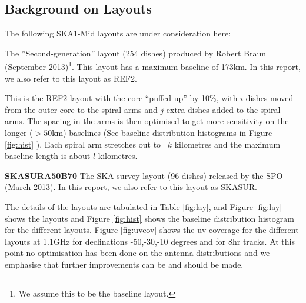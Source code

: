 \documentclass[sfheadings,a4paper,times,9pt,floats,floatfix]{article}
\begin{document}
\subsection{Background on Layouts}\label{sec:layouts}
The following SKA1-Mid layouts are under consideration here:
\begin{description}
\item[{\bf REF2A100B173}] The ”Second-generation” layout (254 dishes) produced by Robert Braun (September 2013)\footnote{We assume
this to be the baseline layout.}. This layout has a maximum baseline of 173km. In this report, we also refer to this layout as
REF2.
\item[{\bf W$i$-$j$A$k$B$l$}] This is the REF2 layout with the core ``puffed up'' by 10\%,  with $ i$ dishes moved  from the
outer core to the spiral arms and $j$ extra dishes added to the spiral arms. The spacing in the arms is then optimised  to get
more sensitivity on the longer ($>50$km) baselines (See baseline distribution histograms in Figure \ref{fig:hist} ). Each spiral
arm stretches out to ~$k$ kilometres and the maximum baseline length is about $l$ kilometres.
\item {\bf SKASURA50B70} The SKA survey layout (96 dishes) released by the SPO (March 2013). In this report, we also refer to
this layout as SKASUR.
\end{description}
The details of the layouts are tabulated in Table \ref{fig:lay}, and Figure \ref{fig:lay} shows the layouts and Figure
\ref{fig:hist} shows the baseline distribution histogram for the different layouts. Figure \ref{fig:uvcov} shows the uv-coverage
for the different layouts at 1.1GHz for declinations -50,-30,-10 
degrees and for 8hr tracks. At this point no optimisation has been
done on the antenna distributions and we emphasise that further improvements can be and should be made.
\end{document}

